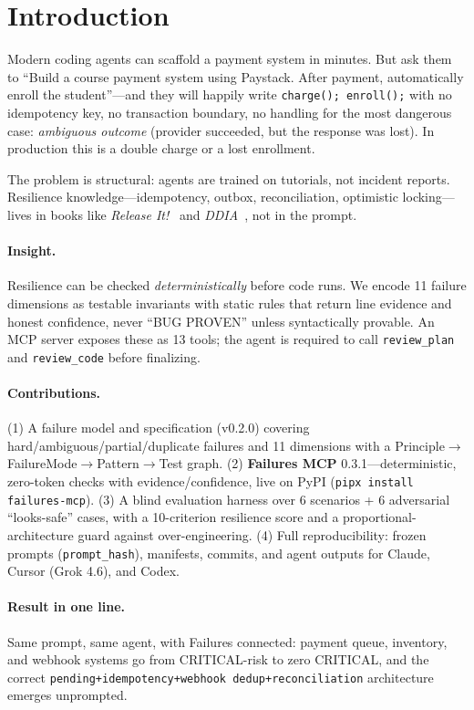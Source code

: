 \section{Introduction}
Modern coding agents can scaffold a payment system in minutes. But ask them to ``Build a course payment system using Paystack. After payment, automatically enroll the student''---and they will happily write \texttt{charge(); enroll();} with no idempotency key, no transaction boundary, no handling for the most dangerous case: \emph{ambiguous outcome} (provider succeeded, but the response was lost). In production this is a double charge or a lost enrollment.

The problem is structural: agents are trained on tutorials, not incident reports. Resilience knowledge---idempotency, outbox, reconciliation, optimistic locking---lives in books like \emph{Release It!}~\cite{releaseit} and \emph{DDIA}~\cite{ddia}, not in the prompt.

\paragraph{Insight.} Resilience can be checked \emph{deterministically} before code runs. We encode 11 failure dimensions as testable invariants with static rules that return line evidence and honest confidence, never ``BUG PROVEN'' unless syntactically provable. An MCP server exposes these as 13 tools; the agent is required to call \texttt{review\_plan} and \texttt{review\_code} before finalizing.

\paragraph{Contributions.}
(1) A failure model and specification (v0.2.0) covering hard/ambiguous/partial/duplicate failures and 11 dimensions with a Principle$\rightarrow$FailureMode$\rightarrow$Pattern$\rightarrow$Test graph.
(2) \textbf{Failures MCP} 0.3.1---deterministic, zero-token checks with evidence/confidence, live on PyPI (\texttt{pipx install failures-mcp}).
(3) A blind evaluation harness over 6 scenarios + 6 adversarial ``looks-safe'' cases, with a 10-criterion resilience score and a proportional-architecture guard against over-engineering.
(4) Full reproducibility: frozen prompts (\texttt{prompt\_hash}), manifests, commits, and agent outputs for Claude, Cursor (Grok 4.6), and Codex.

\paragraph{Result in one line.} Same prompt, same agent, with Failures connected: payment queue, inventory, and webhook systems go from CRITICAL-risk to zero CRITICAL, and the correct \texttt{pending+idempotency+webhook dedup+reconciliation} architecture emerges unprompted.
